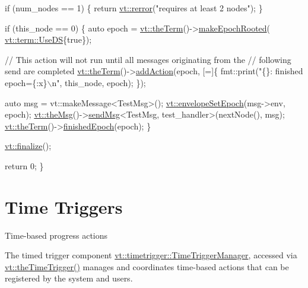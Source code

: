 \begin{DoxyCodeInclude}
  \textcolor{keywordflow}{if} (num\_nodes == 1) \{
    \textcolor{keywordflow}{return} \hyperlink{namespacevt_aff96ace008dc847d4c0f44cfa5dfb3a0}{vt::rerror}(\textcolor{stringliteral}{"requires at least 2 nodes"});
  \}

  \textcolor{keywordflow}{if} (this\_node == 0) \{
    \textcolor{keyword}{auto} epoch = \hyperlink{namespacevt_a127580fdfcaba0b4171e5c48c5676733}{vt::theTerm}()->\hyperlink{structvt_1_1term_1_1_termination_detector_ab0724773b4856bfe8225bc5bc0ca6ec0}{makeEpochRooted}(
      \hyperlink{structvt_1_1term_1_1_use_d_s}{vt::term::UseDS}\{\textcolor{keyword}{true}\});

    \textcolor{comment}{// This action will not run until all messages originating from the}
    \textcolor{comment}{// following send are completed}
    \hyperlink{namespacevt_a127580fdfcaba0b4171e5c48c5676733}{vt::theTerm}()->\hyperlink{structvt_1_1term_1_1_term_action_a1227042cb4eb38937fb8ed34bcbdf998}{addAction}(epoch, [=]\{
      fmt::print(\textcolor{stringliteral}{"\{\}: finished epoch=\{:x\}\(\backslash\)n"}, this\_node, epoch);
    \});

    \textcolor{keyword}{auto} msg = vt::makeMessage<TestMsg>();
    \hyperlink{namespacevt_a4a0a9928690206b588dbcac2afb71088}{vt::envelopeSetEpoch}(msg->env, epoch);
    \hyperlink{namespacevt_aeafd31f866aeb4dc6fc2f6ee97136350}{vt::theMsg}()->\hyperlink{group__preregister_ga0162a39473e7f9b490a79a7983d949ac}{sendMsg}<TestMsg, test\_handler>(nextNode(), msg);
    \hyperlink{namespacevt_a127580fdfcaba0b4171e5c48c5676733}{vt::theTerm}()->\hyperlink{structvt_1_1term_1_1_termination_detector_ad54d75c50bd3f34f30247817737bc303}{finishedEpoch}(epoch);
  \}

  \hyperlink{namespacevt_a540d90dbd6e97b69f1dcbc9ee9314cff}{vt::finalize}();

  \textcolor{keywordflow}{return} 0;
\}
\end{DoxyCodeInclude}
\hypertarget{time-trigger}{}\section{Time Triggers}\label{time-trigger}
Time-\/based progress actions

The timed trigger component {\ttfamily \hyperlink{structvt_1_1timetrigger_1_1_time_trigger_manager}{vt\+::timetrigger\+::\+Time\+Trigger\+Manager}}, accessed via {\ttfamily \hyperlink{namespacevt_a1e1a39cdf2a3fc1adefcdfcca4716bf2}{vt\+::the\+Time\+Trigger()}} manages and coordinates time-\/based actions that can be registered by the system and users.

